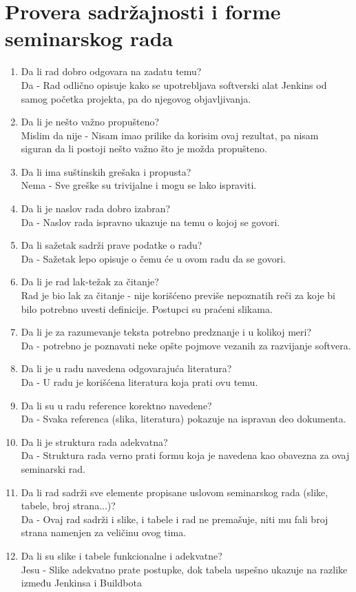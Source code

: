 \documentclass[a4paper]{report}
\begin{document}
\section{Provera sadržajnosti i forme seminarskog rada}

\begin{enumerate}
\item Da li rad dobro odgovara na zadatu temu?\\
	Da - Rad odlično opisuje kako se upotrebljava softverski alat Jenkins od samog početka projekta, pa do njegovog objavljivanja.
\item Da li je nešto važno propušteno?\\
	Mislim da nije - Nisam imao prilike da korisim ovaj rezultat, pa nisam siguran da li postoji nešto važno što je možda propušteno.
\item Da li ima suštinskih grešaka i propusta?\\
	Nema - Sve greške su trivijalne i mogu se lako ispraviti.
\item Da li je naslov rada dobro izabran?\\
	Da - Naslov rada ispravno ukazuje na temu o kojoj se govori.
\item Da li sažetak sadrži prave podatke o radu?\\
	Da - Sažetak lepo opisuje o čemu će u ovom radu da se govori.
\item Da li je rad lak-težak za čitanje?\\
	Rad je bio lak za čitanje - nije korišćeno previše nepoznatih reči za koje bi bilo potrebno uvesti definicije. Postupci su praćeni slikama.
\item Da li je za razumevanje teksta potrebno predznanje i u kolikoj meri?\\
	Da - potrebno je poznavati neke opšte pojmove vezanih za razvijanje softvera.
\item Da li je u radu navedena odgovarajuća literatura?\\
	Da - U radu je korišćena literatura koja prati ovu temu.
\item Da li su u radu reference korektno navedene?\\
	Da -  Svaka referenca (slika, literatura) pokazuje na ispravan deo dokumenta.
\item Da li je struktura rada adekvatna?\\
	Da - Struktura rada verno prati formu koja je navedena kao obavezna za ovaj seminarski rad.
\item Da li rad sadrži sve elemente propisane uslovom seminarskog rada (slike, tabele, broj strana...)?\\
	Da - Ovaj rad sadrži i slike, i tabele i rad ne premašuje, niti mu fali broj strana namenjen za veličinu ovog tima.
\item Da li su slike i tabele funkcionalne i adekvatne?\\
	Jesu - Slike adekvatno prate postupke, dok tabela uspešno ukazuje na razlike između Jenkinsa i Buildbota
\end{enumerate}
\end{document}
